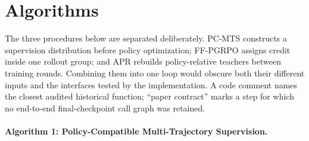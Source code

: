\section{Algorithms}
\label{sec:algorithms}

The three procedures below are separated deliberately.  PC-MTS constructs a
supervision distribution before policy optimization; FF-PGRPO assigns credit
inside one rollout group; and APR rebuilds policy-relative teachers between
training rounds.  Combining them into one loop would obscure both their
different inputs and the interfaces tested by the implementation.  A code
comment names the closest audited historical function; ``paper contract''
marks a step for which no end-to-end final-checkpoint call graph was retained.

\paragraph{Algorithm 1: Policy-Compatible Multi-Trajectory Supervision.}
\label{alg:pcmts}
